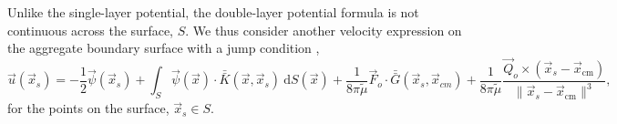 \par
Unlike the single-layer potential, the double-layer potential formula is not continuous across the surface, $S$.
We thus consider another velocity expression on the aggregate boundary surface with a jump condition \cite{pozrikidis_boundary_1992},
\begin{equation}
\vec{u}(\vec{x}_s) = -\frac{1}{2} \vec{\psi}(\vec{x}_s) 
+\int_S  \vec{\psi}(\vec{x})  \cdot \bar{\bar{K}} (\vec{x},\vec{x}_s) \ \text{d}S(\vec{x}) 
+\frac{1}{8 \pi \tilde{\mu} } \vec{F}_o \cdot \bar{\bar{G}}(\vec{x}_{s},\vec{x}_{cm})
+\frac{1}{8 \pi \tilde{\mu} } \frac{\vec{Q}_o \times  (\vec{x}_s   - \vec{x}_{\text{cm}} ) }{\| \vec{x}_s  - \vec{x}_{\text{cm}} \|^3 },
\label{eq_BI_DL_on}
\end{equation}
for the points on the surface, $\vec{x}_s \in S$.
